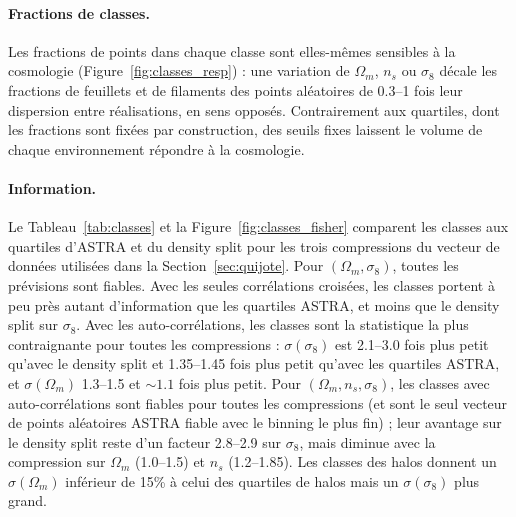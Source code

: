 \documentclass[11pt,twocolumn]{article}
\begin{document}
\paragraph{Fractions de classes.} Les fractions de points dans chaque classe sont elles-mêmes sensibles à la cosmologie (Figure~\ref{fig:classes_resp}) : une variation de $\Omega_m$, $n_s$ ou $\sigma_8$ décale les fractions de feuillets et de filaments des points aléatoires de 0.3--1 fois leur dispersion entre réalisations, en sens opposés. Contrairement aux quartiles, dont les fractions sont fixées par construction, des seuils fixes laissent le volume de chaque environnement répondre à la cosmologie.

\paragraph{Information.} Le Tableau~\ref{tab:classes} et la Figure~\ref{fig:classes_fisher} comparent les classes aux quartiles d'ASTRA et du density split pour les trois compressions du vecteur de données utilisées dans la Section~\ref{sec:quijote}. Pour $(\Omega_m,\sigma_8)$, toutes les prévisions sont fiables. Avec les seules corrélations croisées, les classes portent à peu près autant d'information que les quartiles ASTRA, et moins que le density split sur $\sigma_8$. Avec les auto-corrélations, les classes sont la statistique la plus contraignante pour toutes les compressions : $\sigma(\sigma_8)$ est 2.1--3.0 fois plus petit qu'avec le density split et 1.35--1.45 fois plus petit qu'avec les quartiles ASTRA, et $\sigma(\Omega_m)$ 1.3--1.5 et $\sim1.1$ fois plus petit. Pour $(\Omega_m,n_s,\sigma_8)$, les classes avec auto-corrélations sont fiables pour toutes les compressions (et sont le seul vecteur de points aléatoires ASTRA fiable avec le binning le plus fin) ; leur avantage sur le density split reste d'un facteur 2.8--2.9 sur $\sigma_8$, mais diminue avec la compression sur $\Omega_m$ (1.0--1.5) et $n_s$ (1.2--1.85). Les classes des halos donnent un $\sigma(\Omega_m)$ inférieur de 15\% à celui des quartiles de halos mais un $\sigma(\sigma_8)$ plus grand.
\end{document}
